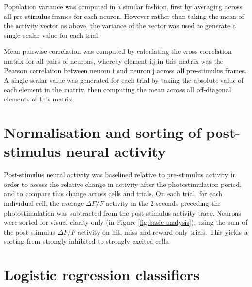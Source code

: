 Population variance was computed in a similar fashion, first by averaging across all pre-stimulus frames for each neuron. However rather than taking the mean of the activity vector as above, the variance of the vector was used to generate a single scalar value for each trial.

Mean pairwise correlation was computed by calculating the cross-correlation matrix for all pairs of neurons, whereby element i,j in this matrix was the Pearson correlation between neuron i and neuron j across all pre-stimulus frames. A single scalar value was generated for each trial by taking the absolute value of each element in the matrix, then computing the mean across all off-diagonal elements of this matrix.


\section{Normalisation and sorting of post-stimulus neural activity}

Post-stimulus neural activity was baselined relative to pre-stimulus activity in order to assess the relative change in activity after the photostimulation period, and to compare this change across cells and trials. On each trial, for each individual cell, the average $\Delta F/F$ activity in the 2 seconds preceding the photostimulation was subtracted from the post-stimulus activity trace. Neurons were sorted for visual clarity only (in Figure \ref{fig:basic-analysis}), using the sum of the post-stimulus $\Delta F/F$ activity on hit, miss and reward only trials. This yields a sorting from strongly inhibited to strongly excited cells. 


\section{Logistic regression classifiers}

